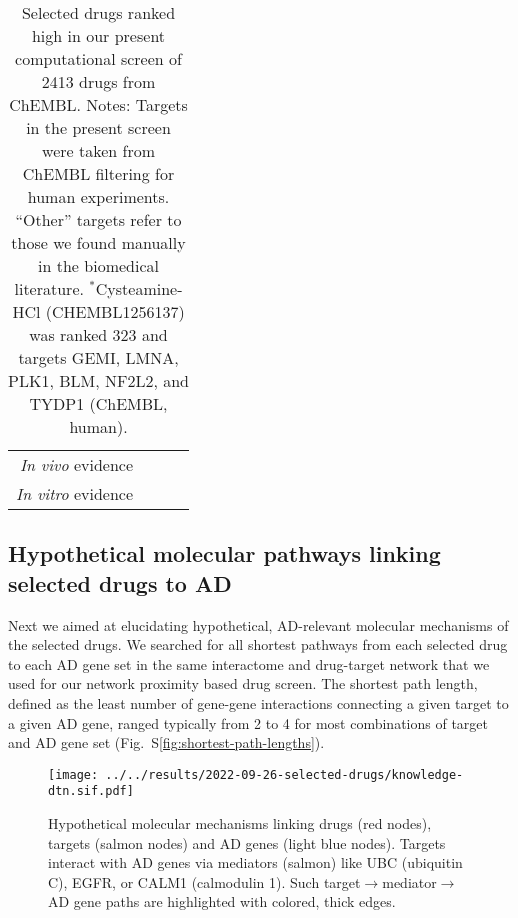 \documentclass[letterpaper]{article}
\begin{document}
\begin{table}
\begin{tabular}{r|c|c|c}
               \emph{In vivo} evidence & \cite{DeMiranda2013,DeMiranda2014} &       \cite{Keene2002} &                \cite{Cicchetti2019} \\
               \emph{In vitro} evidence &      \cite{Lee2019,Rzemieniec2019} &                        &          \cite{Besouw2013,Paul2019} \\
\bottomrule
\end{tabular}
\caption{
Selected drugs ranked high in our present computational screen of 2413 drugs
from ChEMBL.  Notes: Targets in the present screen were taken from ChEMBL filtering for human
experiments. ``Other'' targets refer to those we found manually in the
biomedical literature. $^\ast$Cysteamine-HCl (CHEMBL1256137) was ranked 323
and targets GEMI, LMNA, PLK1, BLM, NF2L2, and TYDP1 (ChEMBL, human).
}
\label{tab:selected-drugs}
\end{table}

\subsection{Hypothetical molecular pathways linking selected drugs to AD}

Next we aimed at elucidating hypothetical, AD-relevant molecular mechanisms of
the selected drugs.  We searched for all shortest pathways from each selected
drug to each AD gene set in the same interactome and drug-target network that
we used for our network proximity based drug screen.  The shortest path
length, defined as the least number of gene-gene interactions connecting a
given target to a given AD gene, ranged typically from 2 to 4 for most
combinations of target and AD gene set
(Fig.~S\ref{fig:shortest-path-lengths}).

\begin{figure}
\texttt{[image: ../../results/2022-09-26-selected-drugs/knowledge-dtn.sif.pdf]}
\caption{Hypothetical molecular mechanisms linking drugs (red nodes), targets
  (salmon nodes) and AD genes (light blue nodes).  Targets interact with AD
  genes via mediators (salmon) like UBC (ubiquitin C), EGFR, or CALM1
  (calmodulin 1).  Such target$\rightarrow$mediator$\rightarrow$AD gene paths
  are highlighted with colored, thick edges.
}
\label{fig:drug-AD-genes-network}
\end{figure}
\end{document}
